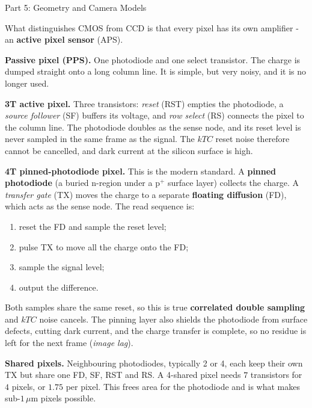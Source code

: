 \documentclass[letterpaper]{article}
\begin{document}
\begin{notes}{Part 5: Geometry and Camera Models}

What distinguishes CMOS from CCD is that every pixel has its own amplifier - an \textbf{active pixel sensor} (APS).

\textbf{Passive pixel (PPS).} One photodiode and one select transistor. The charge is dumped straight onto a long column line. It is simple, but very noisy, and it is no longer used.

\textbf{3T active pixel.} Three transistors: \emph{reset} (RST) empties the photodiode, a \emph{source follower} (SF) buffers its voltage, and \emph{row select} (RS) connects the pixel to the column line. The photodiode doubles as the sense node, and its reset level is never sampled in the same frame as the signal. The $kTC$ reset noise therefore cannot be cancelled, and dark current at the silicon surface is high.

\textbf{4T pinned-photodiode pixel.} This is the modern standard. A \textbf{pinned photodiode} (a buried n-region under a p$^+$ surface layer) collects the charge. A \emph{transfer gate} (TX) moves the charge to a separate \textbf{floating diffusion} (FD), which acts as the sense node. The read sequence is:
\begin{enumerate}[noitemsep, label=(\alph*)]
    \item reset the FD and sample the reset level;
    \item pulse TX to move all the charge onto the FD;
    \item sample the signal level;
    \item output the difference.
\end{enumerate}
Both samples share the same reset, so this is true \textbf{correlated double sampling} and $kTC$ noise cancels. The pinning layer also shields the photodiode from surface defects, cutting dark current, and the charge transfer is complete, so no residue is left for the next frame (\emph{image lag}).

\textbf{Shared pixels.} Neighbouring photodiodes, typically 2 or 4, each keep their own TX but share one FD, SF, RST and RS. A 4-shared pixel needs $7$ transistors for $4$ pixels, or $1.75$ per pixel. This frees area for the photodiode and is what makes sub-$1\,\mu$m pixels possible.



\end{notes}
\end{document}
